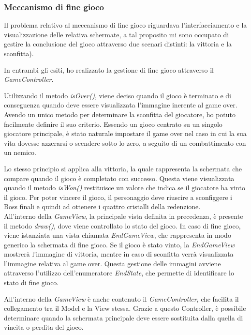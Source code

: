 \documentclass[a4paper,12pt]{report}
\begin{document}
\subsubsection{Meccanismo di fine gioco}
Il problema relativo al meccanismo di fine gioco riguardava l'interfacciamento e la  visualizzazione delle relativa schermate, a tal proposito mi sono occupato di gestire la conclusione del gioco attraverso due scenari distinti: la vittoria e la sconfitta).

In entrambi gli esiti, ho realizzato la gestione di fine gioco attraverso il \textit{GameController}. 

Utilizzando il metodo \textit{isOver()}, viene deciso quando il gioco è terminato e di conseguenza quando deve essere visualizzata l'immagine inerente al game over. Avendo un unico metodo per determinare la sconfitta del giocatore, ho potuto facilmente definire il suo criterio. Essendo un gioco centrato su un singolo giocatore principale, è stato naturale impostare il game over nel caso in cui la sua vita dovesse azzerarsi o scendere sotto lo zero, a seguito di un combattimento con un nemico. 

Lo stesso principio si applica alla vittoria, la quale rappresenta la schermata che compare quando il gioco è completato con successo. Questa viene visualizzata quando il metodo \textit{isWon()} restituisce un valore che indica se il giocatore ha vinto il gioco. Per poter vincere il gioco, il personaggio deve riuscire a sconfiggere i Boss finali e quindi ad ottenere i quattro cristalli della redenzione.\\

All'interno della \textit{GameView}, la principale vista definita in precedenza, è presente il metodo \textit{draw()}, dove viene controllato lo stato del gioco. In caso di fine gioco, viene istanziata una vista chiamata \textit{EndGameView}, che rappresenta in modo generico la schermata di fine gioco. Se il gioco è stato vinto, la \textit{EndGameView} mostrerà l'immagine di vittoria, mentre in caso di sconfitta verrà visualizzata l'immagine relativa al game over. Questa gestione delle immagini avviene attraverso l'utilizzo dell'enumeratore \textit{EndState}, che permette di identificare lo stato di fine gioco.

All'interno della \textit{GameView} è anche contenuto il \textit{GameController}, che facilita il collegamento tra il Model e la View stessa. Grazie a questo Controller, è possibile determinare quando la schermata principale deve essere sostituita dalla quella di vincita o perdita del gioco.
\end{document}
